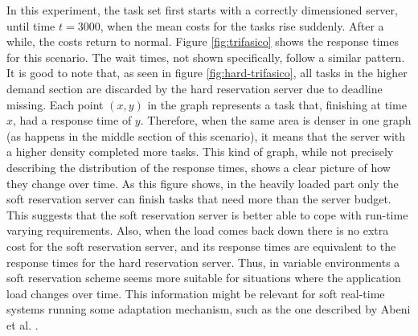 \documentclass[12pt]{article}
\begin{document}
In this experiment, the task set first starts with a correctly
dimensioned server, until time $t=3000$, when the mean costs for the
tasks rise suddenly. After a while, the costs return to normal. Figure
\ref{fig:trifasico} shows the response times for this scenario. The
wait times, not shown specifically, follow a similar pattern. It is
good to note that, as seen in figure \ref{fig:hard-trifasico}, all
tasks in the higher demand section are discarded by the hard
reservation server due to deadline missing.  Each point $(x,y)$ in the
graph represents a task that, finishing at time $x$, had a response
time of $y$. Therefore, when the same area is denser in one graph (as
happens in the middle section of this scenario), it means that the
server with a higher density completed more tasks. This kind of graph,
while not precisely describing the distribution of the response times,
shows a clear picture of how they change over time. As this figure
shows, in the heavily loaded part only the soft reservation server can
finish tasks that need more than the server budget. This suggests that
the soft reservation server is better able to cope with run-time
varying requirements. Also, when the load comes back down there is no
extra cost for the soft reservation server, and its response times are
equivalent to the response times for the hard reservation
server. Thus, in variable environments a soft reservation scheme seems
more suitable for situations where the application load changes over
time. This information might be relevant for soft real-time systems
running some adaptation mechanism, such as the one described by Abeni
et al. \cite{abeni.ea05:qos}.
\end{document}
